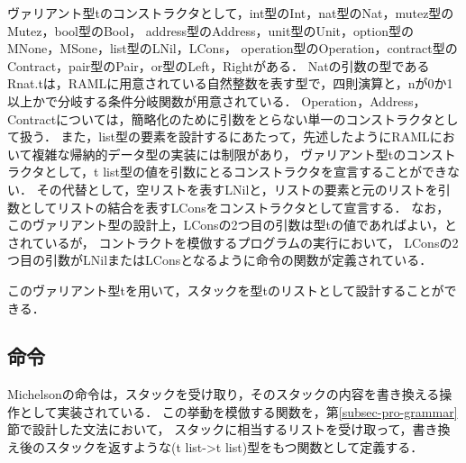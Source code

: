 \documentclass{kuisthesis}
\begin{document}
ヴァリアント型tのコンストラクタとして，int型のInt，nat型のNat，mutez型のMutez，bool型のBool，
address型のAddress，unit型のUnit，option型のMNone，MSone，list型のLNil，LCons，
operation型のOperation，contract型のContract，pair型のPair，or型のLeft，Rightがある．
Natの引数の型であるRnat.tは，RAMLに用意されている自然整数を表す型で，四則演算と，nが0か1以上かで分岐する条件分岐関数が用意されている．
Operation，Address，Contractについては，簡略化のために引数をとらない単一のコンストラクタとして扱う．
また，list型の要素を設計するにあたって，先述したようにRAMLにおいて複雑な帰納的データ型の実装には制限があり，
ヴァリアント型tのコンストラクタとして，t list型の値を引数にとるコンストラクタを宣言することができない．
その代替として，空リストを表すLNilと，リストの要素と元のリストを引数としてリストの結合を表すLConsをコンストラクタとして宣言する．
なお，このヴァリアント型の設計上，LConsの2つ目の引数は型tの値であればよい，とされているが，
コントラクトを模倣するプログラムの実行において，
LConsの2つ目の引数がLNilまたはLConsとなるように命令の関数が定義されている．

このヴァリアント型tを用いて，スタックを型tのリストとして設計することができる．

\subsection{命令} \label{subsec-pro-instr}
Michelsonの命令は，スタックを受け取り，そのスタックの内容を書き換える操作として実装されている．
この挙動を模倣する関数を，第\ref{subsec-pro-grammar}節で設計した文法において，
スタックに相当するリストを受け取って，書き換え後のスタックを返すような(t list->t list)型をもつ関数として定義する．
\end{document}
